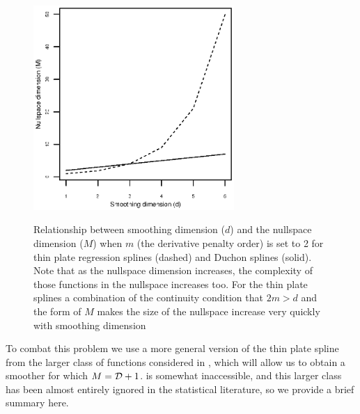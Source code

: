 \documentclass[smallextended]{svjour3}       %
\begin{document}
\begin{figure}
\centering
\includegraphics[width=3in]{Fig2.eps} \\
\caption{Relationship between smoothing dimension ($d$) and the nullspace dimension ($M$) when $m$ (the derivative penalty order) is set to 2 for thin plate regression splines (dashed) and Duchon splines (solid). Note that as the nullspace dimension increases, the complexity of those functions in the nullspace increases too. For the thin plate splines a combination of the continuity condition that $2m>d$ and the form of $M$ makes the size of the nullspace increase very quickly with smoothing dimension}
\label{nullspace-dim}
\end{figure}

To combat this problem we use a more general version of the thin plate spline from the larger class of functions considered in \cite{Duchon:1977tr}, which will allow us to obtain a smoother for which $M = {\cal D} + 1$. \cite{Duchon:1977tr} is somewhat inaccessible, and this larger class has been almost entirely ignored in the statistical literature, so we provide a brief summary here. 
\end{document}
